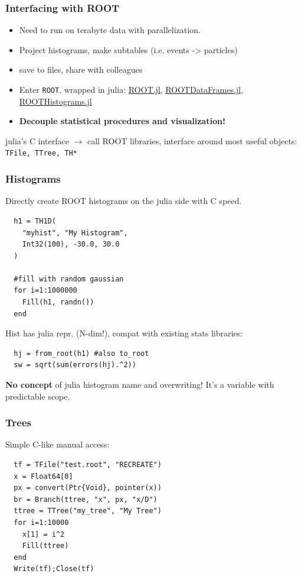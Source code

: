 \documentclass[16pt]{beamer}
\begin{document}
\begin{frame}[fragile]
  \frametitle{Interfacing with ROOT}

  \begin{itemize}
  \item Need to run on terabyte data with parallelization.
  \item Project histograms, make subtables (i.e. events -> particles)
  \item save to files, share with colleagues
  \item Enter \texttt{ROOT}, wrapped in julia: \href{https://github.com/jpata/ROOT.jl}{ROOT.jl}, \href{https://github.com/jpata/ROOTDataFrames.jl}{ROOTDataFrames.jl}, \href{https://github.com/jpata/ROOTHistograms.jl}{ROOTHistograms.jl}
  \item \textbf{Decouple statistical procedures and visualization!} 
  \end{itemize}
  \begin{centering}
  julia's C interface $\rightarrow$ call ROOT libraries, interface around most useful objects:
  \texttt{TFile, TTree, TH*}
  \end{centering}
\end{frame}

\begin{frame}[fragile]
  \frametitle{Histograms}
  Directly create ROOT histograms on the julia side with C speed.
  \begin{lstlisting}
  h1 = TH1D(
    "myhist", "My Histogram",
    Int32(100), -30.0, 30.0
  )

  #fill with random gaussian
  for i=1:1000000
    Fill(h1, randn()) 
  end
  \end{lstlisting}

  Hist has julia repr. (N-dim!), compat with existing stats libraries:
  
  \begin{lstlisting}
  hj = from_root(h1) #also to_root
  sw = sqrt(sum(errors(hj).^2))
  \end{lstlisting}
  \textbf{No concept} of julia histogram name and overwriting! It's a variable with predictable scope. 

\end{frame}


\begin{frame}[fragile]
  \frametitle{Trees}
  Simple C-like manual access: 
  \begin{lstlisting}
  tf = TFile("test.root", "RECREATE")
  x = Float64[0]
  px = convert(Ptr{Void}, pointer(x))
  br = Branch(ttree, "x", px, "x/D")
  ttree = TTree("my_tree", "My Tree")
  for i=1:10000
    x[1] = i^2
    Fill(ttree)
  end
  Write(tf);Close(tf)
  \end{lstlisting}
\end{frame}
\end{document}
